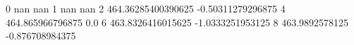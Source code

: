 0 nan nan
1 nan nan
2 464.36285400390625 -0.50311279296875
4 464.865966796875 0.0
6 463.8326416015625 -1.0333251953125
8 463.9892578125 -0.876708984375
